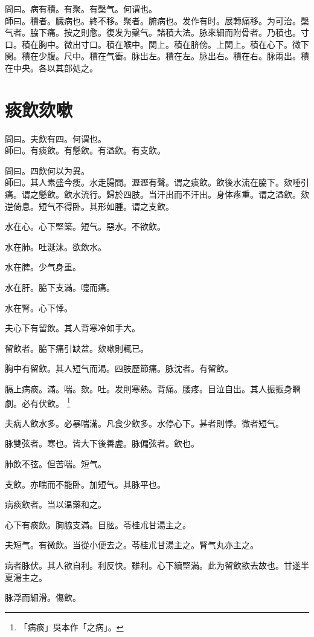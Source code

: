 \documentclass[b5paper,twoside,zihao=-4,UTF8]{ctexbook}
\begin{document}
問曰。病有積。有聚。有䅽气。何谓也。\\
師曰。積者。臓病也。終不移。聚者。腑病也。发作有时。展轉痛移。为可治。䅽气者。脇下痛。按之則愈。復发为䅽气。諸積大法。脉來細而附骨者。乃積也。寸口。積在胸中。微出寸口。積在喉中。関上。積在脐傍。上関上。積在心下。微下関。積在少腹。尺中。積在气衝。脉出左。積在左。脉出右。積在右。脉兩出。積在中央。各以其部処之。

\chapter{痰飲欬嗽}

問曰。夫飲有四。何谓也。\\
師曰。有痰飲。有懸飲。有溢飲。有支飲。

問曰。四飲何以为異。\\
師曰。其人素盛今瘦。水走腸間。瀝瀝有聲。谓之痰飲。飲後水流在脇下。欬唾引痛。谓之懸飲。飲水流行。歸於四肢。当汗出而不汗出。身体疼重。谓之溢飲。欬逆倚息。短气不得卧。其形如腫。谓之支飲。

水在心。心下堅築。短气。惡水。不欲飲。

水在肺。吐涎沫。欲飲水。

水在脾。少气身重。

水在肝。脇下支滿。嚏而痛。

水在腎。心下悸。

夫心下有留飲。其人背寒冷如手大。

留飲者。脇下痛引缺盆。欬嗽則輒已。

胸中有留飲。其人短气而渴。四肢歷節痛。脉沈者。有留飲。

膈上病痰。滿。喘。欬。吐。发則寒熱。背痛。腰疼。目泣自出。其人振振身瞤劇。必有伏飲。
	\footnote{「病痰」吳本作「之病」。}

夫病人飲水多。必暴喘滿。凡食少飲多。水停心下。甚者則悸。微者短气。

脉雙弦者。寒也。皆大下後善虗。脉偏弦者。飲也。

肺飲不弦。但苦喘。短气。

支飲。亦喘而不能卧。加短气。其脉平也。

病痰飲者。当以温藥和之。

心下有痰飲。胸脇支滿。目胘。苓桂朮甘湯主之。

夫短气。有微飲。当從小便去之。苓桂朮甘湯主之。腎气丸亦主之。

病者脉伏。其人欲自利。利反快。雖利。心下續堅滿。此为留飲欲去故也。甘遂半夏湯主之。

脉浮而細滑。傷飲。
\end{document}
